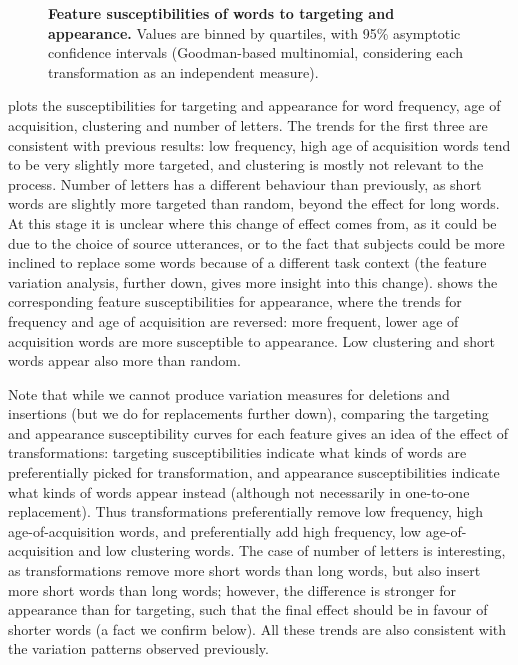 \begin{figure}[!ht]
  \centering

  \caption[Feature susceptibilities of words to targeting and appearance]{
  \textbf{Feature susceptibilities of words to targeting and appearance.}
  Values are binned by quartiles, with 95\% asymptotic confidence intervals (Goodman-based multinomial, considering each transformation as an independent measure).
  }
  \label{fig:gistr-suscept-feature}
\end{figure}

 plots the susceptibilities for
targeting and appearance for word frequency, age of acquisition,
clustering and number of letters. The trends for the first three are
consistent with previous results: low frequency, high age of acquisition
words tend to be very slightly more targeted, and clustering is mostly
not relevant to the process. Number of letters has a different behaviour
than previously, as short words are slightly more targeted than random,
beyond the effect for long words. At this stage it is unclear where this
change of effect comes from, as it could be due to the choice of source
utterances, or to the fact that subjects could be more inclined to
replace some words because of a different task context (the feature
variation analysis, further down, gives more insight into this change).
 shows the corresponding feature
susceptibilities for appearance, where the trends for frequency and age
of acquisition are reversed: more frequent, lower age of acquisition
words are more susceptible to appearance. Low clustering and short words
appear also more than random.

Note that while we cannot produce variation measures for deletions and
insertions (but we do for replacements further down), comparing the
targeting and appearance susceptibility curves for each feature gives an
idea of the effect of transformations: targeting susceptibilities
indicate what kinds of words are preferentially picked for
transformation, and appearance susceptibilities indicate what kinds of
words appear instead (although not necessarily in one-to-one
replacement). Thus transformations preferentially remove low frequency,
high age-of-acquisition words, and preferentially add high frequency,
low age-of-acquisition and low clustering words. The case of number of
letters is interesting, as transformations remove more short words than
long words, but also insert more short words than long words; however,
the difference is stronger for appearance than for targeting, such that
the final effect should be in favour of shorter words (a fact we confirm
below). All these trends are also consistent with the variation patterns
observed previously.

